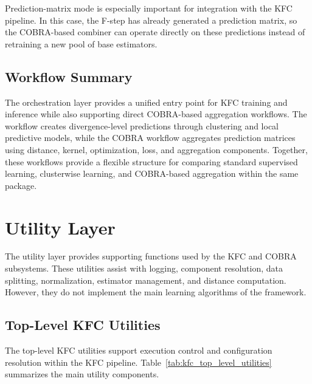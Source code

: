 Prediction-matrix mode is especially important for integration with the KFC pipeline. In this case, the F-step has already generated a prediction matrix, so the COBRA-based combiner can operate directly on these predictions instead of retraining a new pool of base estimators.


\subsection{Workflow Summary}

\hs The orchestration layer provides a unified entry point for KFC training and inference while also supporting direct COBRA-based aggregation workflows. The \KFCProcedure{} workflow creates divergence-level predictions through clustering and local predictive models, while the COBRA workflow aggregates prediction matrices using distance, kernel, optimization, loss, and aggregation components. Together, these workflows provide a flexible structure for comparing standard supervised learning, clusterwise learning, and COBRA-based aggregation within the same package.


\section{Utility Layer}
\label{sec:utility_layer}

\hs The utility layer provides supporting functions used by the KFC and COBRA subsystems. These utilities assist with logging, component resolution, data splitting, normalization, estimator management, and distance computation. However, they do not implement the main learning algorithms of the framework.

\subsection{Top-Level KFC Utilities}

The top-level KFC utilities support execution control and configuration resolution within the KFC pipeline. Table~\ref{tab:kfc_top_level_utilities} summarizes the main utility components.

